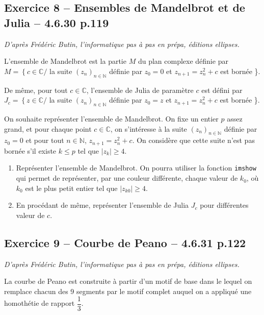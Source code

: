 \documentclass[10pt,fleqn]{article} %
\begin{document}
\begin{multicols}{2}
\subsection*{Exercice 8 -- Ensembles de Mandelbrot et de Julia -- 4.6.30 p.119}
\begin{flushright}
\textit{D'après Frédéric Butin, l'informatique pas à pas en prépa, éditions ellipses.}
\end{flushright}

L'ensemble de Mandelbrot est la partie $M$ du plan complexe définie par $M=\left\{c \in \mathbb{C} / \right.$ la suite $\left(z_n \right)_{n\in\mathbb{N}}$ définie par $z_0=0$ et $z_{n+1}=z_n^2+c$ est bornée \}.

De même, pour tout $c \in \mathbb{C}$, l'ensemble de Julia de paramètre $c$ est défini par 
$J_c=\left\{z \in \mathbb{C} / \right.$ la suite $\left(z_n \right)_{n\in\mathbb{N}}$ définie par $z_0=z$ et $z_{n+1}=z_n^2+c$ est bornée \}.

On souhaite représenter l'ensemble de Mandelbrot. On fixe un entier $p$ assez grand, et pour chaque point $c\in\mathbb{C}$, on s'intéresse à la suite $\left(z_n \right)_{n\in\mathbb{N}}$ définie par $z_0=0$ et pour tout $n\in\mathbb{N}$, $z_{n+1}=z_n^2+c$. On considère que cette suite n'est pas bornée s'il existe $k\leq p$ tel que $|z_k| \geq 4$.

\begin{enumerate} 
\item Représenter l'ensemble de Mandelbrot. On pourra utiliser la fonction \texttt{imshow} qui permet de représenter, par une couleur différente, chaque valeur de $k_0$, où $k_0$ est le plus petit entier tel que $|z_{k0}|\geq 4$.
\item En procédant de même, représenter l'ensemble de Julia $J_c$ pour différentes valeur de $c$.
\end{enumerate}

\subsection*{Exercice 9 -- Courbe de Peano -- 4.6.31 p.122}
\begin{flushright}
\textit{D'après Frédéric Butin, l'informatique pas à pas en prépa, éditions ellipses.}
\end{flushright}

La courbe de Peano est construite à partir d'un motif de base dans le lequel on remplace chacun des 9 segments par le motif complet auquel on a appliqué une homothétie de rapport $\dfrac{1}{3}$. 


\end{multicols}
\end{document}
